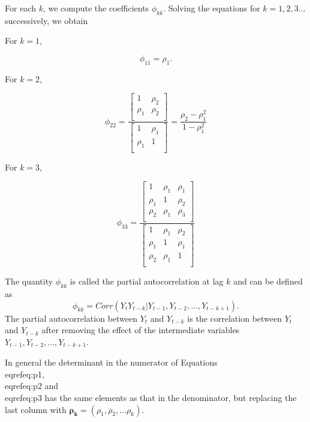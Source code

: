 \documentclass[11pt,a4paper,]{article}
\begin{document}
{For each $k$, we compute the coefficients $\phi_{kk}$. Solving the equations for $k=1, 2, 3...$ successively, we obtain

For $k=1$,

\begin{equation}
\label{eq:p1}
\phi_{11}=\rho_1.
\end{equation}

For $k=2$,

\begin{equation}
\label{eq:p2}
\phi_{22}=\frac{\left[\begin{array}
{rr}
1 & \rho_2  \\
\rho_1 & \rho_2  \\
\end{array}\right]}{\left[\begin{array}
{rr}
1 & \rho_1  \\
\rho_1 & 1  \\
\end{array}\right]} = \frac{\rho_2-\rho_1^2}{1-\rho_1^2}
\end{equation}

For $k=3$,

\begin{equation}
\label{eq:p3}
\phi_{33}=\frac{\left[\begin{array}
{rrr}
1 & \rho_1 & \rho_1  \\
\rho_1 & 1 & \rho_2  \\
\rho_2 & \rho_1 & \rho_3  \\
\end{array}\right]}{\left[\begin{array}
{rrr}
1 & \rho_1 & \rho_2  \\
\rho_1 & 1 & \rho_1  \\
\rho_2 & \rho_1 & 1  \\
\end{array}\right]}
\end{equation}

The quantity $\phi_{kk}$ is called the partial autocorrelation at lag $k$ and can be defined as 
$$\phi_{kk}=Corr(Y_tY_{t-k}|Y_{t-1}, Y_{t-2},..., Y_{t-k+1}).$$
The partial autocorrelation between $Y_t$ and $Y_{t-k}$ is the correlation between $Y_t$ and $Y_{t-k}$ after removing the effect of the intermediate variables $Y_{t-1}, Y_{t-2}, ..., Y_{t-k+1}$.


In general the determinant in the numerator of Equations \\eqref{eq:p1}, \\eqref{eq:p2} and \\eqref{eq:p3} has the same elements as that in the denominator, but replacing the last column with $\bm{\rho_k}= (\rho_1, \rho_2,...\rho_k).$

}
\end{document}
